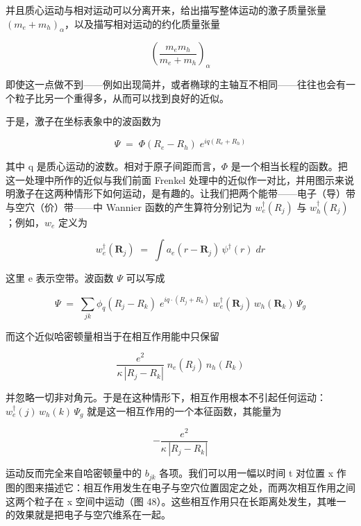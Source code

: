 并且质心运动与相对运动可以分离开来，给出描写整体运动的激子质量张量 $\left(m_e + m_h\right)_{\alpha}$，以及描写相对运动的约化质量张量

\begin{equation*}
\left(\frac{m_e m_h}{m_e + m_h}\right)_{\alpha}
\end{equation*}

即使这一点做不到——例如出现简并，或者椭球的主轴互不相同——往往也会有一个粒子比另一个重得多，从而可以找到良好的近似。

于是，激子在坐标表象中的波函数为

\begin{equation*}
\Psi \;=\; \Phi(R_e - R_h)\;e^{iq\left(R_e + R_h\right)}
\end{equation*}

其中 q 是质心运动的波数。相对于原子间距而言，$\Phi$ 是一个相当长程的函数。把这一处理中所作的近似与我们前面 Frenkel 处理中的近似作一对比，并用图示来说明激子在这两种情形下如何运动，是有趣的。让我们把两个能带——电子（导）带与空穴（价）带——中 Wannier 函数的产生算符分别记为 $w_e^{\dagger}(R_j)$ 与 $w_h^{\dagger}(R_j)$；例如，$w_e$ 定义为

\begin{equation*}
w_e^{\dagger}(\mathbf{R}_j) \;=\; \int a_e(r - \mathbf{R}_j)\,\psi^{\dagger}(r)\;dr
\end{equation*}

这里 e 表示空带。波函数 $\Psi$ 可以写成

\begin{equation*}
\Psi \;=\; \sum_{jk}\phi_q(R_j - R_k)\;e^{iq\cdot\left(R_j + R_k\right)}\;w_e^{\dagger}(\mathbf{R}_j)\,w_h(\mathbf{R}_k)\,\Psi_g
\end{equation*}

而这个近似哈密顿量相当于在相互作用能中只保留

\begin{equation*}
\frac{e^{2}}{\kappa\,|R_j - R_k|}\;n_e(R_j)\,n_h(R_k)
\end{equation*}

并忽略一切非对角元。于是在这种情形下，相互作用根本不引起任何运动：$w_e^{\dagger}(j)\,w_h(k)\,\Psi_g$ 就是这一相互作用的一个本征函数，其能量为

\begin{equation*}
-\frac{e^{2}}{\kappa\,|R_j - R_k|}
\end{equation*}

运动反而完全来自哈密顿量中的 $b_{jk}$ 各项。我们可以用一幅以时间 t 对位置 x 作图的图来描述它：相互作用发生在电子与空穴位置固定之处，而两次相互作用之间这两个粒子在 x 空间中运动（图 48）。这些相互作用只在长距离处发生，其唯一的效果就是把电子与空穴维系在一起。

